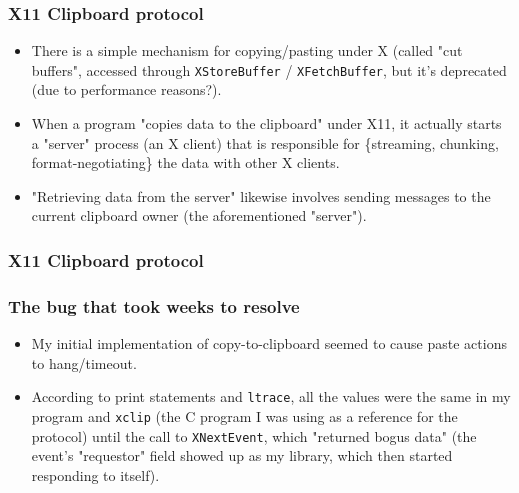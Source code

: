 \documentclass{beamer}
\begin{document}
\begin{frame}[fragile]
\frametitle{X11 Clipboard protocol}
\begin{itemize}
\item
There is a simple mechanism for copying/pasting under X (called "cut buffers", accessed through \verb|XStoreBuffer| / \verb|XFetchBuffer|, but it's deprecated (due to performance reasons?).
\item
When a program "copies data to the clipboard" under X11, it actually starts a "server" process (an X client) that is responsible for \{streaming, chunking, format-negotiating\} the data with other X clients.
\item
"Retrieving data from the server" likewise involves sending messages to the current clipboard owner (the aforementioned "server").
\end{itemize}
\end{frame}

\begin{frame}[fragile]
\frametitle{X11 Clipboard protocol}
\end{frame}

\begin{frame}[fragile]
\frametitle{The bug that took weeks to resolve}
\begin{itemize}
\item
My initial implementation of copy-to-clipboard seemed to cause paste actions to hang/timeout.
\item
According to print statements and \verb|ltrace|, all the values were the same in my program and \verb|xclip| (the C program I was using as a reference for the protocol) until the call to \verb|XNextEvent|, which "returned bogus data" (the event's "requestor" field showed up as my library, which then started responding to itself).
\end{itemize}
\end{frame}
\end{document}
